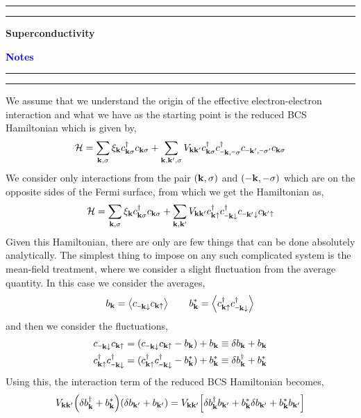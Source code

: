 \documentclass{article}
\newcommand{\SH}{\mathcal{H}}
\newcommand{\vk}{\vb{k}}
\newcommand{\sm}{\mathord{\scalebox{0.6}[1]{$-$}}}
\newcommand{\vkd}{\vb{k}'}
\newcommand{\vks}{\vb{k}\sigma}
\newcommand{\vkdsd}{\vb{k}\sigma}
\newcommand{\mkms}{\sm\vb{k},\sm\sigma}
\newcommand{\mkdmsd}{\sm\vb{k}',\sm\sigma'}
\newcommand{\cksd}{c^{\dagger}_{\vks}}
\newcommand{\ckdsd}{c_{\vkdsd}}
\newcommand{\cmkmsd}{c^{\dagger}_{\mkms}}
\newcommand{\cmkdmsd}{c_{\mkdmsd}}
\newcommand{\kup}{\vk\uparrow}
\newcommand{\kdown}{\sm\vk\downarrow}
\newcommand{\kdup}{\vk'\uparrow}
\newcommand{\kddown}{\sm\vk'\downarrow}
\newcommand{\cks}{c_{\vks}}
\newcommand{\cd}{c^\dagger}
\begin{document}
\hrule \vspace*{0.1cm}
\hrule
\begin{center}
    {\Large\bfseries Superconductivity}\par
    \vspace{0.35em}
    {\large\bfseries \textcolor{blue}{Notes}}\par
\end{center}
\hrule \vspace*{0.1cm}
\hrule
\vspace{0.5cm}
We assume that we understand the origin of the effective electron-electron interaction and what we have as the starting point is the reduced BCS Hamiltonian which is given by,
\begin{equation}
\SH = \sum\limits_{\vk, \sigma}\xi_{\vk}\cksd\cks + \sum\limits_{\vk, \vkd, \sigma}V_{\vk\vkd}\cksd\cmkmsd\cmkdmsd\ckdsd
\end{equation}
We consider only interactions from the pair $(\vk,\sigma)$ and $(-\vk, -\sigma)$ which are on the opposite sides of the Fermi surface, from which we get the Hamiltonian as,
\begin{equation}
    \SH = \sum\limits_{\vk, \sigma}\xi_{\vk}\cksd\cks + \sum\limits_{\vk, \vkd}V_{\vk\vkd}\cd_{\kup}\cd_{\kdown}c_{\kddown}c_{\kdup}
\end{equation}
Given this Hamiltonian, there are only are few things that can be done absolutely analytically. The simplest thing to impose on any such complicated system is the mean-field treatment, where we consider a slight fluctuation from the average quantity. In this case we consider the averages,
\begin{equation}
    b_{\vk} = \expval{c_{\kdown}c_{\kup}} \qquad  b_{\vk}^* = \expval{\cd_{\kup}\cd_{\kdown}}
\end{equation}
and then we consider the fluctuations,
\begin{align}
  \begin{split}
      c_{\kdown}c_{\kup} &=(c_{\kdown}c_{\kup} - b_{\vk}) + b_{\vk} \equiv  \delta b_{\vk}+b_{\vk}\\
    \cd_{\kup}\cd_{\kdown} &=( \cd_{\kup}\cd_{\kdown} - b_{\vk}^*) + b_{\vk}^* \equiv  \delta b_{\vk}^\dagger+b_{\vk}^*
  \end{split}
\end{align}
Using this, the interaction term of the reduced BCS Hamiltonian becomes,
\begin{align}
    V_{\vk\vkd}\qty(\delta b_{\vk}^\dagger+b_{\vk}^*)(\delta b_{\vk'}+b_{\vk'}) =  V_{\vk\vkd}\qty[\delta b_{\vk}^\dagger b_{\vk'} + b_{\vk}^*\delta b_{\vk'} + b_{\vk}^*b_{\vk'}]
\end{align}
\end{document}
